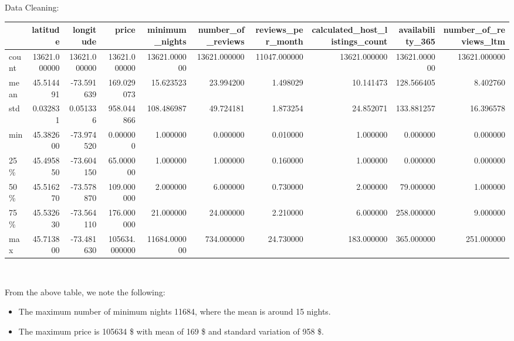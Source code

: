 \documentclass[
  ignorenonframetext,
]{beamer}
\providecommand{\tightlist}{%
  \setlength{\itemsep}{0pt}\setlength{\parskip}{0pt}}\usepackage{longtable,booktabs,array}
\begin{document}
\begin{frame}[fragile]{Data Cleaning:}
\begin{tabular}{lrrrrrrrrr}
\toprule
{} &      latitude &     longitude &          price &  minimum\_nights &  number\_of\_reviews &  reviews\_per\_month &  calculated\_host\_listings\_count &  availability\_365 &  number\_of\_reviews\_ltm \\
\midrule
count &  13621.000000 &  13621.000000 &   13621.000000 &    13621.000000 &       13621.000000 &       11047.000000 &                    13621.000000 &      13621.000000 &           13621.000000 \\
mean  &     45.514491 &    -73.591639 &     169.029073 &       15.623523 &          23.994200 &           1.498029 &                       10.141473 &        128.566405 &               8.402760 \\
std   &      0.032831 &      0.051336 &     958.044866 &      108.486987 &          49.724181 &           1.873254 &                       24.852071 &        133.881257 &              16.396578 \\
min   &     45.382600 &    -73.974520 &       0.000000 &        1.000000 &           0.000000 &           0.010000 &                        1.000000 &          0.000000 &               0.000000 \\
25\%   &     45.495850 &    -73.604150 &      65.000000 &        1.000000 &           1.000000 &           0.160000 &                        1.000000 &          0.000000 &               0.000000 \\
50\%   &     45.516270 &    -73.578870 &     109.000000 &        2.000000 &           6.000000 &           0.730000 &                        2.000000 &         79.000000 &               1.000000 \\
75\%   &     45.532630 &    -73.564110 &     176.000000 &       21.000000 &          24.000000 &           2.210000 &                        6.000000 &        258.000000 &               9.000000 \\
max   &     45.713800 &    -73.481630 &  105634.000000 &    11684.000000 &         734.000000 &          24.730000 &                      183.000000 &        365.000000 &             251.000000 \\
\bottomrule
\end{tabular}

~

From the above table, we note the following:

\begin{itemize}
\tightlist
\item
  The maximum number of minimum nights 11684, where the mean is around
  15 nights.
\item
  The maximum price is 105634 \$ with mean of 169 \$ and standard
  variation of 958 \$.
\end{itemize}


\end{frame}
\end{document}
